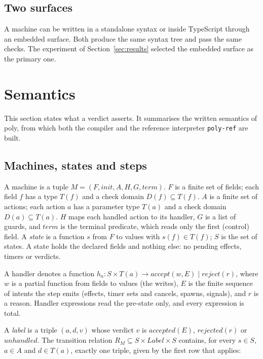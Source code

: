 \documentclass[11pt]{article}
\newcommand{\poly}{\textsf{poly}}
\begin{document}
\subsection{Two surfaces}

A machine can be written in a standalone syntax or inside TypeScript through an embedded surface. Both produce the same syntax tree and pass the same checks. The experiment of Section~\ref{sec:results} selected the embedded surface as the primary one.

\section{Semantics}
\label{sec:sem}

This section states what a verdict asserts. It summarises the written semantics of \poly{}, from which both the compiler and the reference interpreter \texttt{poly-ref} are built.

\subsection{Machines, states and steps}

A machine is a tuple $M = (F, \mathit{init}, A, H, G, \mathit{term})$. $F$ is a finite set of fields; each field $f$ has a type $T(f)$ and a check domain $D(f) \subseteq T(f)$. $A$ is a finite set of actions; each action $a$ has a parameter type $T(a)$ and a check domain $D(a) \subseteq T(a)$. $H$ maps each handled action to its handler, $G$ is a list of guards, and $\mathit{term}$ is the terminal predicate, which reads only the first (control) field. A \emph{state} is a function $s$ from $F$ to values with $s(f) \in T(f)$; $S$ is the set of states. A state holds the declared fields and nothing else: no pending effects, timers or verdicts.

A handler denotes a function $h_a : S \times T(a) \to \mathit{accept}(w, E) \mid \mathit{reject}(r)$, where $w$ is a partial function from fields to values (the writes), $E$ is the finite sequence of intents the step emits (effects, timer sets and cancels, spawns, signals), and $r$ is a reason. Handler expressions read the pre-state only, and every expression is total.

A \emph{label} is a triple $(a, d, v)$ whose verdict $v$ is $\mathit{accepted}(E)$, $\mathit{rejected}(r)$ or $\mathit{unhandled}$. The transition relation $R_M \subseteq S \times \mathit{Label} \times S$ contains, for every $s \in S$, $a \in A$ and $d \in T(a)$, exactly one triple, given by the first row that applies:
\end{document}
